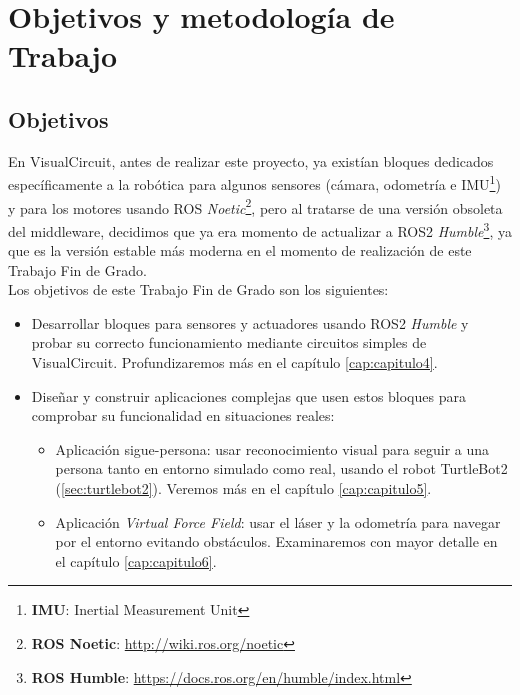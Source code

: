 \chapter{Objetivos y metodología de Trabajo}
\label{cap:capitulo2}

\section{Objetivos}
\label{sec:objetivos}

En VisualCircuit, antes de realizar este proyecto, ya existían bloques dedicados específicamente a la robótica para algunos sensores
(cámara, odometría e IMU\footnote{\textbf{IMU}: Inertial Measurement Unit}) y para los motores usando ROS
\textit{Noetic}\footnote{\textbf{ROS Noetic}: \url{http://wiki.ros.org/noetic}}, pero al tratarse de una versión obsoleta del middleware,
decidimos que ya era momento de actualizar a ROS2 \textit{Humble}\footnote{\textbf{ROS Humble}: \url{https://docs.ros.org/en/humble/index.html}},
ya que es la versión estable más moderna en el momento de realización de este Trabajo Fin de Grado.\\

Los objetivos de este Trabajo Fin de Grado son los siguientes:

\begin{itemize}
	\item   Desarrollar bloques para sensores y actuadores usando ROS2 \textit{Humble} y probar su correcto funcionamiento mediante
                        circuitos simples de VisualCircuit.
                    Profundizaremos más en el capítulo \ref{cap:capitulo4}.
	\item   Diseñar y construir aplicaciones complejas que usen estos bloques para comprobar su funcionalidad en situaciones reales:
    \begin{itemize}
        \item   Aplicación sigue-persona: usar reconocimiento visual para seguir a una persona tanto en entorno simulado como real,
                    usando el robot TurtleBot2 (\ref{sec:turtlebot2}).
                    Veremos más en el capítulo \ref{cap:capitulo5}.
        \item   Aplicación \textit{Virtual Force Field}: usar el láser y la odometría para navegar por el entorno evitando obstáculos.
                    Examinaremos con mayor detalle en el capítulo \ref{cap:capitulo6}.
    \end{itemize}
\end{itemize}

